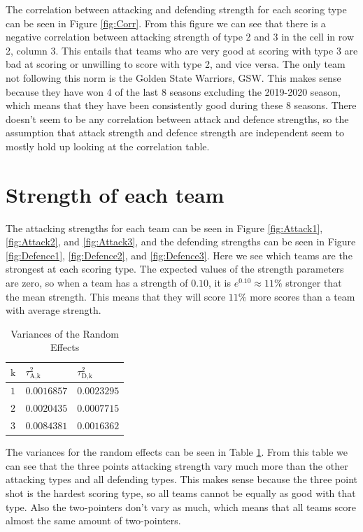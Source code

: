 \noindent The correlation between attacking and defending strength for each scoring type can be seen in Figure \ref{fig:Corr}. From this figure we can see that there is a negative correlation between attacking strength of type 2 and 3 in the cell in row 2, column 3. This entails that teams who are very good at scoring with type 3 are bad at scoring or unwilling to score with type 2, and vice versa. The only team not following this norm is the Golden State Warriors, GSW. This makes sense because they have won 4 of the last 8 seasons excluding the 2019-2020 season, which means that they have been consistently good during these 8 seasons. There doesn't seem to be any correlation between attack and defence strengths, so the assumption that attack strength and defence strength are independent seem to mostly hold up looking at the correlation table.

\section{Strength of each team}

\noindent The attacking strengths for each team can be seen in Figure \ref{fig:Attack1}, \ref{fig:Attack2}, and \ref{fig:Attack3}, and the defending strengths can be seen in Figure \ref{fig:Defence1}, \ref{fig:Defence2}, and \ref{fig:Defence3}. Here we see which teams are the strongest at each scoring type. The expected values of the strength parameters are zero, so when a team has a strength of $0.10$, it is $e^{0.10} \approx 11\%$ stronger that the mean strength. This means that they will score $11\%$ more scores than a team with average strength. \\

\begin{table}[H]
\centering
\begin{tabular}{ |p{.5cm}|p{2cm}|p{2cm}|  }
    \hline
    $\text{k}$ & $\tau_{\text{A},\text{k}}^2$ & $\tau_{\text{D},\text{k}}^2$ \\
    \hline
    $1$ & $0.0016857$ & $0.0023295$ \\
    $2$ & $0.0020435$ & $0.0007715$ \\
    $3$ & $0.0084381$ & $0.0016362$ \\
    \hline
\end{tabular}
\caption{Variances of the Random Effects}
\label{table:randomEffCovidVar}
\end{table}

\noindent The variances for the random effects can be seen in Table \ref{table:randomEffCovidVar}. From this table we can see that the three points attacking strength vary much more than the other attacking types and all defending types. This makes sense because the three point shot is the hardest scoring type, so all teams cannot be equally as good with that type. Also the two-pointers don't vary as much, which means that all teams score almost the same amount of two-pointers.

